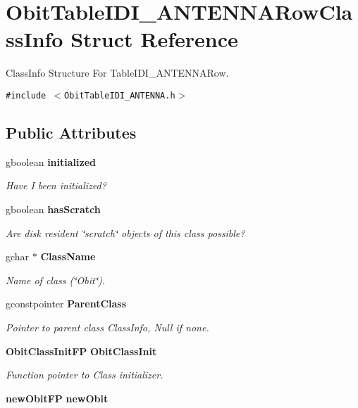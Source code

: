 \section{Obit\-Table\-IDI\_\-ANTENNARow\-Class\-Info Struct Reference}
\label{structObitTableIDI__ANTENNARowClassInfo}
Class\-Info Structure For Table\-IDI\_\-ANTENNARow.  


{\tt \#include $<$Obit\-Table\-IDI\_\-ANTENNA.h$>$}

\subsection*{Public Attributes}
\begin{CompactItemize}
\item 
gboolean {\bf initialized}
\begin{CompactList}\small\item\em Have I been initialized? \item\end{CompactList}\item 
gboolean {\bf has\-Scratch}
\begin{CompactList}\small\item\em Are disk resident \char`\"{}scratch\char`\"{} objects of this class possible? \item\end{CompactList}\item 
gchar $\ast$ {\bf Class\-Name}
\begin{CompactList}\small\item\em Name of class (\char`\"{}Obit\char`\"{}). \item\end{CompactList}\item 
gconstpointer {\bf Parent\-Class}
\begin{CompactList}\small\item\em Pointer to parent class Class\-Info, Null if none. \item\end{CompactList}\item 
{\bf Obit\-Class\-Init\-FP} {\bf Obit\-Class\-Init}
\begin{CompactList}\small\item\em Function pointer to Class initializer. \item\end{CompactList}\item 
{\bf new\-Obit\-FP} {\bf new\-Obit}

\end{CompactItemize}
